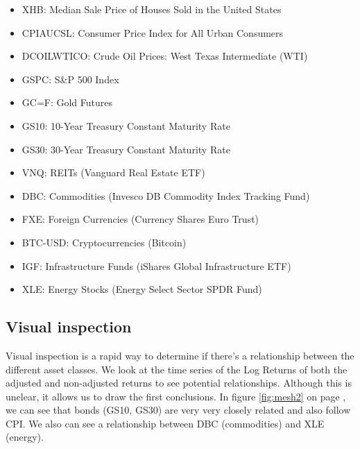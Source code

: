 \documentclass{article}
\begin{document}
\begin{itemize}
    \item XHB: Median Sale Price of Houses Sold in the United States
    \item CPIAUCSL: Consumer Price Index for All Urban Consumers
    \item DCOILWTICO: Crude Oil Prices: West Texas Intermediate (WTI)
    \item GSPC: S\&P 500 Index
    \item GC=F: Gold Futures
    \item GS10: 10-Year Treasury Constant Maturity Rate
    \item GS30: 30-Year Treasury Constant Maturity Rate
    \item VNQ: REITs (Vanguard Real Estate ETF)
    \item DBC: Commodities (Invesco DB Commodity Index Tracking Fund)
    \item FXE: Foreign Currencies (Currency Shares Euro Trust)
    \item BTC-USD: Cryptocurrencies (Bitcoin)
    \item IGF: Infrastructure Funds (iShares Global Infrastructure ETF)
    \item XLE: Energy Stocks (Energy Select Sector SPDR Fund)
\end{itemize}


\subsection{Visual inspection}

Visual inspection is a rapid way to determine if there's a relationship between the different asset classes. We look at the time series of the Log Returns of both the adjusted and non-adjusted returns to see potential relationships. Although this is unclear, it allows us to draw the first conclusions. In figure \ref{fig:mesh2} on page \pageref{fig:mesh2}, we can see that bonds (GS10, GS30) are very very closely related and also follow CPI. We also can see a relationship between DBC (commodities) and XLE (energy).
\end{document}
